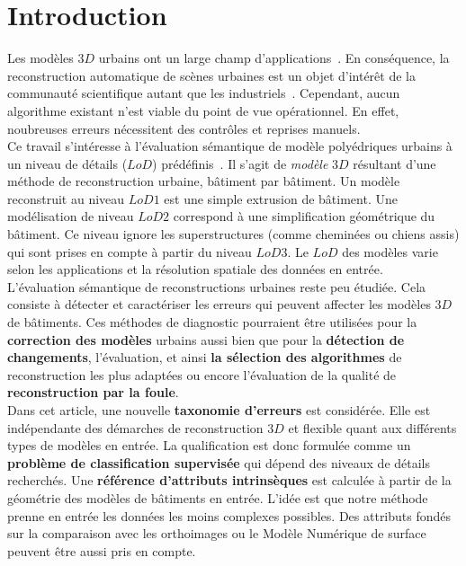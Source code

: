 \documentclass[a4paper,french]{article}
\begin{document}
    \section{Introduction}
    Les modèles $3D$ urbains ont un large champ d'applications~\cite{Biljecki2015}. En conséquence, la reconstruction automatique de scènes urbaines est un objet d'intérêt de la communauté scientifique autant que les industriels~\cite{Musialski2012}. Cependant, aucun algorithme existant n'est viable du point de vue opérationnel. En effet, noubreuses erreurs nécessitent des contrôles et reprises manuels.\\
    Ce travail s'intéresse à l'évaluation sémantique de modèle polyédriques urbains à un niveau de détails ($LoD$) prédéfinis~\cite{kolbe2005citygml}. Il s'agit de \textit{modèle} $3D$ résultant d'une méthode de reconstruction urbaine, bâtiment par bâtiment. Un modèle reconstruit au niveau $LoD 1$ est une simple extrusion de bâtiment. Une modélisation de niveau $LoD 2$ correspond à une simplification géométrique du bâtiment. Ce niveau ignore les superstructures (comme cheminées ou chiens assis) qui sont prises en compte à partir du niveau $LoD 3$. Le $LoD$ des modèles varie selon les applications et la résolution spatiale des données en entrée.\\
    L'évaluation sémantique de reconstructions urbaines reste peu étudiée. Cela consiste à détecter et caractériser les erreurs qui peuvent affecter les modèles $3D$ de bâtiments. Ces méthodes de diagnostic pourraient être utilisées pour la \textbf{correction des modèles} urbains aussi bien que pour la \textbf{détection de changements}, l'évaluation, et ainsi \textbf{la sélection des algorithmes} de reconstruction les plus adaptées ou encore l'évaluation de la qualité de \textbf{reconstruction par la foule}.\\
    Dans cet article, une nouvelle \textbf{taxonomie d'erreurs} est considérée. Elle est indépendante des démarches de reconstruction $3D$ et flexible quant aux différents types de modèles en entrée. La qualification est donc formulée comme un \textbf{problème de classification supervisée} qui dépend des niveaux de détails recherchés. Une \textbf{référence d'attributs intrinsèques} est calculée à partir de la géométrie des modèles de bâtiments en entrée. L'idée est que notre méthode prenne en entrée les données les moins complexes possibles. Des attributs fondés sur la comparaison avec les orthoimages ou le Modèle Numérique de surface peuvent être aussi pris en compte.
\end{document}

